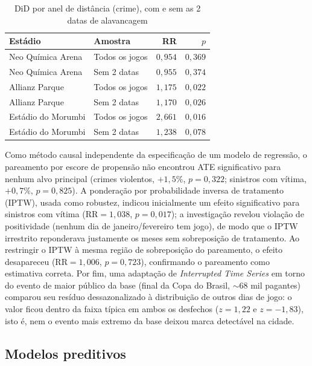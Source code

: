 \documentclass[12pt]{article}
\begin{document}
\begin{table}[ht]
\centering
\caption{DiD por anel de distância (crime), com e sem as 2 datas de
alavancagem}
\label{tab:did-anel}
\small
\begin{tabular}{@{}llrr@{}}
\toprule
\textbf{Estádio} & \textbf{Amostra} & \textbf{RR} & \textbf{$p$} \\
\midrule
Neo Química Arena  & Todos os jogos   & $0,954$ & $0,369$ \\
Neo Química Arena  & Sem 2 datas      & $0,955$ & $0,374$ \\
Allianz Parque     & Todos os jogos   & $1,175$ & $0,022$ \\
Allianz Parque     & Sem 2 datas      & $1,170$ & $0,026$ \\
Estádio do Morumbi & Todos os jogos   & $2,661$ & $0,016$ \\
Estádio do Morumbi & Sem 2 datas      & $1,238$ & $0,078$ \\
\bottomrule
\end{tabular}
\end{table}

Como método causal independente da especificação de um modelo de
regressão, o pareamento por escore de propensão não encontrou ATE
significativo para nenhum alvo principal (crimes violentos, $+1,5\%$,
$p=0,322$; sinistros com vítima, $+0,7\%$, $p=0,825$). A ponderação por
probabilidade inversa de tratamento (IPTW), usada como robustez, indicou
inicialmente um efeito significativo para sinistros com vítima
($\text{RR}=1,038$, $p=0,017$); a investigação revelou violação de
positividade (nenhum dia de janeiro/fevereiro tem jogo), de modo que o
IPTW irrestrito reponderava justamente os meses sem sobreposição de
tratamento. Ao restringir o IPTW à mesma região de sobreposição do
pareamento, o efeito desapareceu ($\text{RR}=1,006$, $p=0,723$),
confirmando o pareamento como estimativa correta. Por fim, uma adaptação
de \emph{Interrupted Time Series} em torno do evento de maior público da
base (final da Copa do Brasil, $\sim$68 mil pagantes) comparou seu resíduo
dessazonalizado à distribuição de outros dias de jogo: o valor ficou
dentro da faixa típica em ambos os desfechos ($z=1,22$ e $z=-1,83$), isto
é, nem o evento mais extremo da base deixou marca detectável na cidade.

\subsection{Modelos preditivos}
\end{document}
